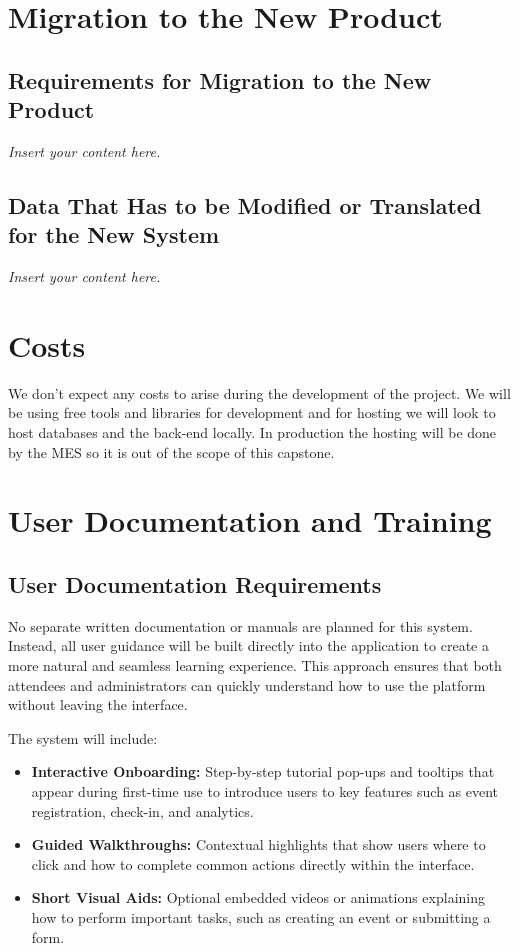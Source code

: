 \documentclass[12pt]{article}
\newcommand{\lips}{\textit{Insert your content here.}}
\begin{document}
\section{Migration to the New Product}
\subsection{Requirements for Migration to the New Product}
\lips
\subsection{Data That Has to be Modified or Translated for the New System}
\lips

\section{Costs}
We don't expect any costs to arise during the development of the project. We will be using free tools and libraries for development and for hosting we will look to host databases and the back-end locally. In production the hosting will be done by the MES so it is out of the scope of this capstone.

\section{User Documentation and Training}

\subsection{User Documentation Requirements}

No separate written documentation or manuals are planned for this system.  
Instead, all user guidance will be built directly into the application to create a more natural and seamless learning experience.  
This approach ensures that both attendees and administrators can quickly understand how to use the platform without leaving the interface.

The system will include:
\begin{itemize}
    \item \textbf{Interactive Onboarding:}  
    Step-by-step tutorial pop-ups and tooltips that appear during first-time use to introduce users to key features such as event registration, check-in, and analytics.
    
    \item \textbf{Guided Walkthroughs:}  
    Contextual highlights that show users where to click and how to complete common actions directly within the interface.
    
    \item \textbf{Short Visual Aids:}  
    Optional embedded videos or animations explaining how to perform important tasks, such as creating an event or submitting a form.
\end{itemize}
\end{document}
